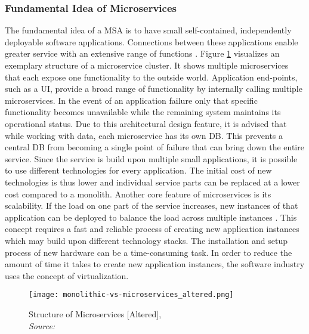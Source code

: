         \subsubsection{Fundamental Idea of Microservices}\label{sssec::micro}
        The fundamental idea of a \ac{MSA} is to have small self-contained, independently deployable software applications. Connections between these applications enable greater service with an extensive range of functions \cite{micro}. Figure \ref{fig::micro} visualizes an exemplary structure of a microservice cluster. It shows multiple microservices that each expose one functionality to the outside world. Application end-points, such as a \ac{UI}, provide a broad range of functionality by internally calling multiple microservices. In the event of an application failure only that specific functionality becomes unavailable while the remaining system maintains its operational status. Due to this architectural design feature, it is advised that while working with data, each microservice has its own \ac{DB}. This prevents a central \acl{DB} from becoming a single point of failure that can bring down the entire service. Since the service is build upon multiple small applications, it is possible to use different technologies for every application. The initial cost of new technologies is thus lower and individual service parts can be replaced at a lower cost compared to a monolith. Another core feature of microservices is its scalability. If the load on one part of the service increases, new instances of that application can be deployed to balance the load across multiple instances \cite{micro}. This concept requires a fast and reliable process of creating new application instances which may build upon different technology stacks.\newline
        The installation and setup process of new hardware can be a time-consuming task. In order to reduce the amount of time it takes to create new application instances, the software industry uses the concept of virtualization.

        \begin{figure}
            \centering
            \texttt{[image: monolithic-vs-microservices\_altered.png]}
            \caption{Structure of Microservices \textemdash{} [Altered], \\\textit{Source:~\cite{redhat_micro}}}\label{fig::micro}
        \end{figure}

